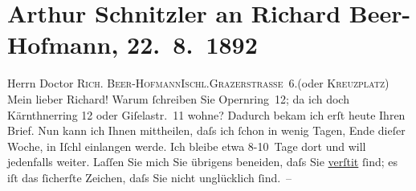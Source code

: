 

         
         \newcommand{\erwaehntePersonen}{Personen: Richard Beer-Hofmann, Paul Goldmann}
         \newcommand{\erwaehnteInstitutionen}{}
         \newcommand{\erwaehnteOrte}{Orte: Bad Ischl, Bösendorferstraße, Grazer Straße, Kreuzplatz, Kärntnerring, Opernring, San Sebastian, Wien}
         \newcommand{\erwaehnteWerke}{Werke: Frankfurter Zeitung, Spanisches Strandleben}
               \section[Arthur Schnitzler an Richard Beer-Hofmann, 22. 8. 1892]{ Arthur Schnitzler an Richard Beer-Hofmann, 22. 8. 1892}\nopagebreak{}\rehead{ }\begin{ledgroupsized}[t]{13cm}\normalsize\beginnumbering \toendnotes[C]{\smallbreak\pagebreak[2]} 
\toendnotes[C]{\smallbreak}\pstart{}{\pb}Herrn Doctor \textsc{Rich. Beer-Hofmann}\pend{}\pstart{}\textsc{Ischl.}\pend{}\pstart{}\textsc{Grazerstraße 6}.\pend{}\pstart{}(oder \textsc{Kreuzplatz})\pend{}{\bigskip}\pstart
           \noindent{}{\pb}Mein lieber Richard! Warum ſchreiben Sie Opernring 12; da ich doch Kärnthnerring
                  12 oder Giſelastr. 11 wohne?
               Dadurch bekam ich erſt heute Ihren Brief. Nun kann ich Ihnen mittheilen, daſs ich
               ſchon in wenig Tagen, Ende dieſer Woche, in Iſchl
               einlangen werde. Ich bleibe etwa 8-10 Tage dort und will jedenfalls weiter. Laſſen
               Sie mich Sie übrigens beneiden, {\pb}daſs Sie \uline{verſti{\geminationm}t}{ }ſind; es iſt das
               ſicherſte Zeichen, daſs Sie nicht unglücklich ſind. –\pend

\end{ledgroupsized}

